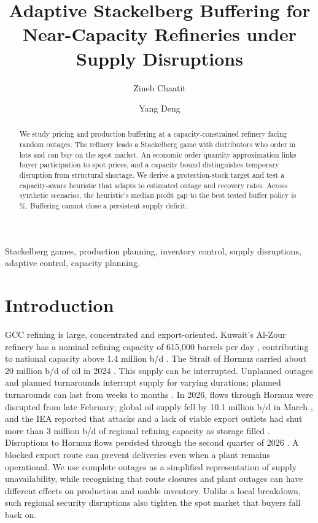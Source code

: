 \documentclass{ifacconf}
\newcommand{\rev}[1]{#1}
\newcommand{\MissingResult}{\ifmmode\text{\normalfont\color{red}\footnotesize[missing]}\else{\normalfont\color{red}\footnotesize[missing]}\fi}
\providecommand{\RuleGapMedian}{\MissingResult}
\providecommand{\SensN}{\MissingResult}
\begin{document}
\begin{frontmatter}
\title{Adaptive Stackelberg Buffering for Near-Capacity Refineries under Supply Disruptions}
\author[AUS]{Zineb Chaatit}
\author[AUS]{Yang Deng}
\address[AUS]{Department of Industrial Engineering, American University of Sharjah, Sharjah, United Arab Emirates (corresponding author: ydeng@aus.edu).}
\begin{abstract}
We study pricing and production buffering at a capacity-constrained refinery facing random outages. The refinery leads a Stackelberg game with distributors who order in lots and can buy on the spot market. An economic order quantity approximation links buyer participation to spot prices, and a capacity bound distinguishes temporary disruption from structural shortage. We derive a protection-stock target and test a capacity-aware heuristic that adapts to estimated outage and recovery rates. Across \SensN{} synthetic scenarios, the heuristic's median profit gap to the best tested buffer policy is \RuleGapMedian\%. Buffering cannot close a persistent supply deficit.
\end{abstract}
\begin{keyword}
Stackelberg games, production planning, inventory control, supply disruptions, adaptive control, capacity planning.
\end{keyword}
\end{frontmatter}

\section{Introduction}
GCC refining is large, concentrated and export-oriented. \rev{Kuwait's Al-Zour refinery has a nominal refining capacity of 615,000 barrels per day \citep{kipic2023}, contributing to national capacity above 1.4 million b/d \citep{eiakuwait}. The Strait of Hormuz carried about 20 million b/d of oil in 2024 \citep{eiahormuz2025}.} This supply can be interrupted. \rev{Unplanned outages and planned turnarounds interrupt supply for varying durations; planned turnarounds can last from weeks to months \citep{afpm2023}.} In 2026, flows through Hormuz were disrupted from late February; global oil supply fell by 10.1 million b/d in March \citep{worldbank2026}, \rev{and the IEA reported that attacks and a lack of viable export outlets had shut more than 3 million b/d of regional refining capacity as storage filled \citep{iea2026march}.} Disruptions to Hormuz flows persisted through the second quarter of 2026 \citep{eia2026}. \rev{A blocked export route can prevent deliveries even when a plant remains operational. We use complete outages as a simplified representation of supply unavailability, while recognising that route closures and plant outages can have different effects on production and usable inventory.} Unlike a local breakdown, such regional security disruptions also tighten the spot market that buyers fall back on.
\end{document}
